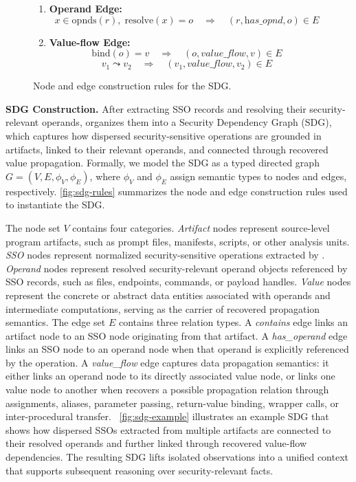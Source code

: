 \begin{figure}[t]
{\begin{minipage}{0.99\linewidth}
\begin{enumerate}[leftmargin=15pt, label=\arabic*.]
    \item \textbf{Operand Edge:}
    \[
    x \in \mathrm{opnds}(r),\;\mathrm{resolve}(x)=o
    \quad \Rightarrow \quad
    (r,\textit{has\_opnd},o)\in E
    \]

    \item \textbf{Value-flow Edge:}
    \[
    \mathrm{bind}(o)=v
    \quad \Rightarrow \quad
    (o,\textit{value\_flow},v)\in E
    \]
    \[
    v_1 \leadsto v_2
    \quad \Rightarrow \quad
    (v_1,\textit{value\_flow},v_2)\in E
    \]
\end{enumerate}
\end{minipage}
}
\caption{Node and edge construction rules for the SDG.}
\label{fig:sdg-rules}
\end{figure}


\noindent \textbf{SDG Construction.}  
After extracting SSO records and resolving their security-relevant operands, \toolname organizes them into a Security Dependency Graph (SDG), which captures how dispersed security-sensitive operations are grounded in artifacts, linked to their relevant operands, and connected through recovered value propagation. Formally, we model the SDG as a typed directed graph \(G=(V,E,\phi_V,\phi_E)\), where \(\phi_V\) and \(\phi_E\) assign semantic types to nodes and edges, respectively. \autoref{fig:sdg-rules} summarizes the node and edge construction rules used to instantiate the SDG.

The node set \(V\) contains four categories. \emph{Artifact} nodes represent source-level program artifacts, such as prompt files, manifests, scripts, or other analysis units. \emph{SSO} nodes represent normalized security-sensitive operations extracted by \toolname. \emph{Operand} nodes represent resolved security-relevant operand objects referenced by SSO records, such as files, endpoints, commands, or payload handles. \emph{Value} nodes represent the concrete or abstract data entities associated with operands and intermediate computations, serving as the carrier of recovered propagation semantics.
The edge set \(E\) contains three relation types. A \emph{contains} edge links an artifact node to an SSO node originating from that artifact. A \emph{has\_operand} edge links an SSO node to an operand node when that operand is explicitly referenced by the operation. A \emph{value\_flow} edge captures data propagation semantics: it either links an operand node to its directly associated value node, or links one value node to another when \toolname recovers a possible propagation relation through assignments, aliases, parameter passing, return-value binding, wrapper calls, or inter-procedural transfer. 
~\autoref{fig:sdg-example} illustrates an example SDG that shows how dispersed SSOs extracted from multiple artifacts are connected to their resolved operands and further linked through recovered value-flow dependencies. The resulting SDG lifts isolated observations into a unified context that supports subsequent reasoning over security-relevant facts.

